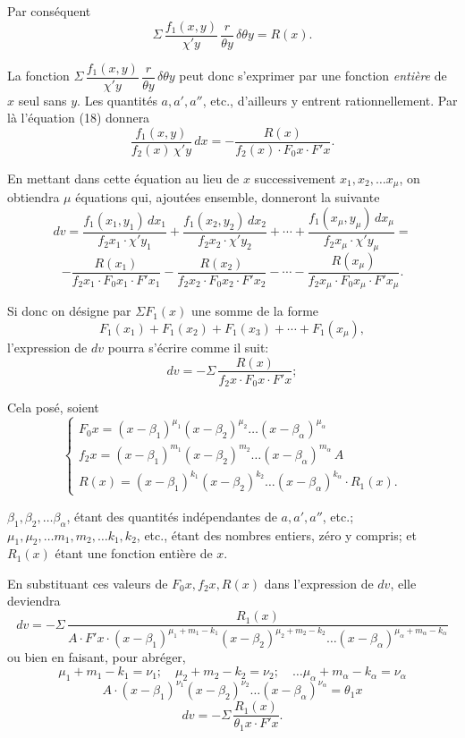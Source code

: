 \documentclass{article}
\begin{document}
Par conséquent
\[ \Sigma\,\frac{f_1(x, y)}{\chi' y}\,\frac{r}{\theta y}\,\delta\theta y = R(x). \tag{19} \]

La fonction $\Sigma\,\dfrac{f_1(x, y)}{\chi' y}\,\dfrac{r}{\theta y}\,\delta\theta y$ peut donc s'exprimer par une fonction \emph{entière} de $x$ seul sans $y$. Les quantités $a, a', a''$, etc., d'ailleurs y entrent rationnellement.
Par là l'équation (18) donnera
\[ \frac{f_1(x, y)}{f_2(x)\,\chi' y}\,dx = -\frac{R(x)}{f_2(x) \cdot F_0 x \cdot F' x}. \tag{20} \]

En mettant dans cette équation au lieu de $x$ successivement $x_1, x_2, \ldots x_\mu$, on obtiendra $\mu$ équations qui, ajoutées ensemble, donneront la suivante
\[ dv = \frac{f_1(x_1, y_1)\,dx_1}{f_2 x_1 \cdot \chi' y_1} + \frac{f_1(x_2, y_2)\,dx_2}{f_2 x_2 \cdot \chi' y_2} + \cdots + \frac{f_1(x_\mu, y_\mu)\,dx_\mu}{f_2 x_\mu \cdot \chi' y_\mu} = \]
\[ -\frac{R(x_1)}{f_2 x_1 \cdot F_0 x_1 \cdot F' x_1} - \frac{R(x_2)}{f_2 x_2 \cdot F_0 x_2 \cdot F' x_2} - \cdots - \frac{R(x_\mu)}{f_2 x_\mu \cdot F_0 x_\mu \cdot F' x_\mu}. \tag{21} \]

Si donc on désigne par $\Sigma F_1(x)$ une somme de la forme
\[ F_1(x_1) + F_1(x_2) + F_1(x_3) + \cdots + F_1(x_\mu), \]
l'expression de $dv$ pourra s'écrire comme il suit:
\[ dv = -\Sigma\,\frac{R(x)}{f_2 x \cdot F_0 x \cdot F' x}; \tag{22} \]

Cela posé, soient
\[ \begin{cases} F_0 x = (x-\beta_1)^{\mu_1}(x-\beta_2)^{\mu_2} \ldots (x-\beta_\alpha)^{\mu_\alpha} \\ f_2 x = (x-\beta_1)^{m_1}(x-\beta_2)^{m_2} \ldots (x-\beta_\alpha)^{m_\alpha}\,A \\ R(x) = (x-\beta_1)^{k_1}(x-\beta_2)^{k_2} \ldots (x-\beta_\alpha)^{k_\alpha} \cdot R_1(x). \end{cases} \tag{23} \]

$\beta_1, \beta_2, \ldots \beta_\alpha$, étant des quantités indépendantes de $a, a', a''$, etc.; $\mu_1, \mu_2, \ldots m_1, m_2, \ldots k_1, k_2$, etc., étant des nombres entiers, zéro y compris; et $R_1(x)$ étant une fonction entière de $x$.

En substituant ces valeurs de $F_0 x, f_2 x, R(x)$ dans l'expression de $dv$, elle deviendra
\[ dv = -\Sigma\,\frac{R_1(x)}{A \cdot F' x \cdot (x-\beta_1)^{\mu_1+m_1-k_1}(x-\beta_2)^{\mu_2+m_2-k_2} \ldots (x-\beta_\alpha)^{\mu_\alpha+m_\alpha-k_\alpha}} \]
ou bien en faisant, pour abréger,
\[ \mu_1 + m_1 - k_1 = \nu_1; \quad \mu_2 + m_2 - k_2 = \nu_2; \quad \ldots \mu_\alpha + m_\alpha - k_\alpha = \nu_\alpha \tag{24} \]
\[ A \cdot (x-\beta_1)^{\nu_1}(x-\beta_2)^{\nu_2} \ldots (x-\beta_\alpha)^{\nu_\alpha} = \theta_1 x \tag{25} \]
\[ dv = -\Sigma\,\frac{R_1(x)}{\theta_1 x \cdot F' x}. \tag{26} \]
\end{document}
